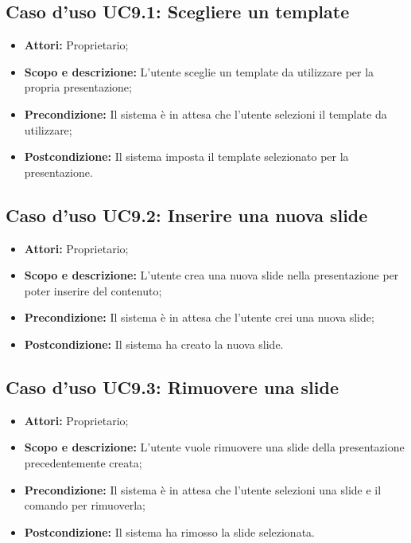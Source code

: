 \subsection{Caso d'uso UC9.1: Scegliere un template}
\begin{itemize}
	\item \textbf{Attori:} Proprietario;
	\item \textbf{Scopo e descrizione:} L'utente sceglie un template da utilizzare per la propria presentazione;
	\item \textbf{Precondizione:} Il sistema è in attesa che l'utente selezioni il template da utilizzare;
	\item \textbf{Postcondizione:} Il sistema imposta il template selezionato per la presentazione.
\end{itemize}


\subsection{Caso d'uso UC9.2: Inserire una nuova slide}
\begin{itemize}
	\item \textbf{Attori:} Proprietario;
	\item \textbf{Scopo e descrizione:} L'utente crea una nuova slide nella presentazione per poter inserire del contenuto;
	\item \textbf{Precondizione:} Il sistema è in attesa che l'utente crei una nuova slide;
	\item \textbf{Postcondizione:} Il sistema ha creato la nuova slide.
\end{itemize}


\subsection{Caso d'uso UC9.3: Rimuovere una slide}
\begin{itemize}
	\item \textbf{Attori:} Proprietario;
	\item \textbf{Scopo e descrizione:} L'utente vuole rimuovere una slide della presentazione precedentemente creata;
	\item \textbf{Precondizione:} Il sistema è in attesa che l'utente selezioni una slide e il comando per rimuoverla;
	\item \textbf{Postcondizione:} Il sistema ha rimosso la slide selezionata.
\end{itemize}


